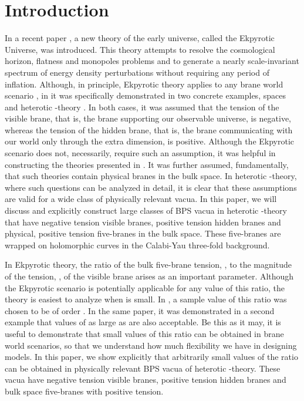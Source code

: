 \documentclass[a4paper,12pt]{article}
\numberwithin{equation}{section}
\theoremstyle{plain}
\begin{document}

\section{Introduction}

In a recent paper \cite{EU}, a new theory of the early universe, called the
Ekpyrotic Universe, was introduced. This theory attempts to resolve the 
cosmological horizon, flatness and monopoles problems and to generate a 
nearly scale-invariant spectrum of energy density perturbations 
without requiring any period of inflation. Although, in principle, 
Ekpyrotic theory applies to any brane world scenario \cite{BW1,BW1B,
BW2,BW3,BW4,BW5,BW6},
in \cite{EU} it was specifically demonstrated in two concrete examples, \coordHE{}
spaces \cite{BW5} and heterotic \coordHE{}-theory \cite{BW1,BW1B,HW}.
In both cases, it was assumed
that the tension of the visible brane, that is, the brane supporting our
observable universe, is negative, whereas the tension of the hidden brane, that
is, the brane communicating with our world only through the extra dimension, 
is positive. Although the 
Ekpyrotic scenario does not, necessarily, require such an assumption, 
it was helpful in constructing the theories presented in \cite{EU}. It was further
assumed, fundamentally, that such theories contain physical branes in the bulk
space. In heterotic \coordHE{}-theory, where such questions can be analyzed
in detail, it is clear that these assumptions are valid for a wide class of 
physically relevant vacua. In this paper, we will discuss and explicitly construct
large classes of BPS vacua in heterotic \coordHE{}-theory that have negative tension visible
branes, positive tension hidden branes and physical, positive tension 
five-branes in the bulk space. These five-branes are wrapped on holomorphic
curves in the Calabi-Yau three-fold background.

In Ekpyrotic theory, the ratio of the bulk five-brane tension, \myHighlight{$\beta$}\coordHE{}, 
to the magnitude of the tension, \myHighlight{$|\alpha|$}\coordHE{}, of the visible brane arises as an 
important parameter. Although the Ekpyrotic scenario is potentially 
applicable for any value of this ratio, the theory is easiest to analyze when
\myHighlight{$\beta/|\alpha|$}\coordHE{} is small. In \cite{EU}, a sample value of this ratio was chosen to
be of order \coordHE{}. In the same paper, it was demonstrated in a second
example that
values of \myHighlight{$\beta/|\alpha|$}\coordHE{} as large as \coordHE{} are also acceptable. Be this as
it may, it is useful to demonstrate that small values of this ratio can be
obtained in brane world scenarios, so that we understand how much 
flexibility we
have in designing models. In this paper, we show explicitly
that arbitrarily small values of the ratio \myHighlight{$\beta/|\alpha|$}\coordHE{} can be obtained in
physically relevant BPS vacua of heterotic \coordHE{}-theory. These vacua have negative
tension visible branes, positive tension hidden branes and bulk space
five-branes with positive tension.
\end{document}
